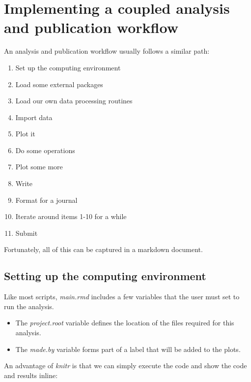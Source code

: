 \documentclass[11pt,]{article}
\providecommand{\tightlist}{%
  \setlength{\itemsep}{0pt}\setlength{\parskip}{0pt}}
\begin{document}
\hypertarget{implementing-a-coupled-analysis-and-publication-workflow}{%
\section{Implementing a coupled analysis and publication workflow}\label{implementing-a-coupled-analysis-and-publication-workflow}}

An analysis and publication workflow usually follows a similar path:

\begin{enumerate}
\def\labelenumi{\arabic{enumi}.}
\tightlist
\item
  Set up the computing environment
\item
  Load some external packages
\item
  Load our own data processing routines
\item
  Import data
\item
  Plot it
\item
  Do some operations
\item
  Plot some more
\item
  Write
\item
  Format for a journal
\item
  Iterate around items 1-10 for a while
\item
  Submit
\end{enumerate}

Fortunately, all of this can be captured in a markdown document.

\hypertarget{setting-up-the-computing-environment}{%
\subsection{Setting up the computing environment}\label{setting-up-the-computing-environment}}

Like most scripts, \emph{main.rmd} includes a few variables that the user must set to run the analysis.

\begin{itemize}
\tightlist
\item
  The \emph{project.root} variable defines the location of the files required for this analysis.
\item
  The \emph{made.by} variable forms part of a label that will be added to the plots.
\end{itemize}

An advantage of \emph{knitr} is that we can simply execute the code and show the code and results inline:
\end{document}
